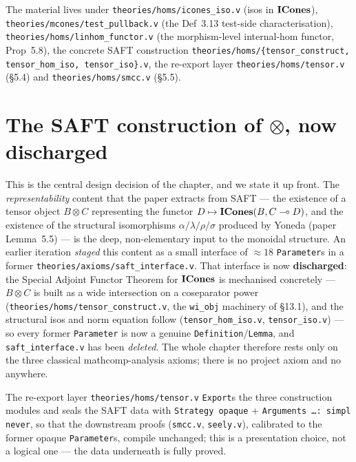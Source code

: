 The material lives under \texttt{theories/homs/icones\_iso.v} (isos in
$\mathbf{ICones}$), \texttt{theories/mcones/test\_pullback.v} (the Def~3.13
test-side characterisation), \texttt{theories/homs/linhom\_functor.v}
(the morphism-level internal-hom functor, Prop~5.8), the concrete SAFT
construction \texttt{theories/homs/\{tensor\_construct,
tensor\_hom\_iso, tensor\_iso\}.v}, the re-export layer
\texttt{theories/homs/tensor.v} (\S5.4) and
\texttt{theories/homs/smcc.v} (\S5.5).

\section{The SAFT construction of \texorpdfstring{$\otimes$}{(x)}, now discharged}%
\label{sec:tensor-staging}

This is the central design decision of the chapter, and we state it up
front. The \emph{representability} content that the paper extracts
from SAFT --- the existence of a tensor object $B \otimes C$
representing the functor $D \mapsto \mathbf{ICones}(B, C \multimap D)$, and the
existence of the structural isomorphisms $\alpha/\lambda/\rho/\sigma$
produced by Yoneda (paper Lemma~5.5) --- is the deep, non-elementary
input to the monoidal structure. An earlier iteration \emph{staged}
this content as a small interface of $\approx 18$ \texttt{Parameter}s
in a former \texttt{theories/axioms/saft\_interface.v}. That interface is
now \textbf{discharged}: the Special Adjoint Functor Theorem for $\mathbf{ICones}$
is mechanised concretely --- $B \otimes C$ is built as a wide
intersection on a coseparator power
(\texttt{theories/homs/tensor\_construct.v}, the \texttt{wi\_obj}
machinery of \S13.1), and the structural isos and norm equation follow
(\texttt{tensor\_hom\_iso.v}, \texttt{tensor\_iso.v}) --- so every former
\texttt{Parameter} is now a genuine \texttt{Definition}/\texttt{Lemma},
and \texttt{saft\_interface.v} has been \emph{deleted}. The whole
chapter therefore rests only on the three classical mathcomp-analysis
axioms; there is no project axiom and no \Admitted{} anywhere.

The re-export layer \texttt{theories/homs/tensor.v}
\texttt{Export}s the three construction modules and seals the SAFT data
with \texttt{Strategy opaque} + \texttt{Arguments \ldots : simpl never},
so that the downstream proofs (\texttt{smcc.v}, \texttt{seely.v}),
calibrated to the former opaque \texttt{Parameter}s, compile unchanged;
this is a presentation choice, not a logical one --- the data underneath
is fully proved.

